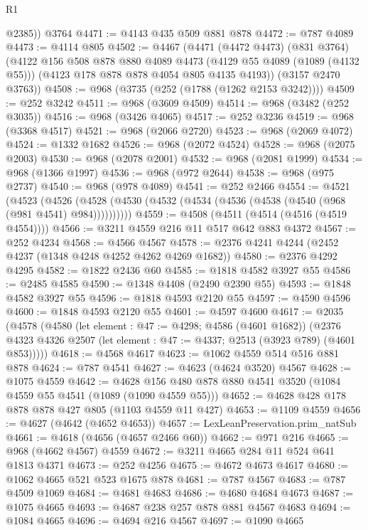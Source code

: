 \begin{lexlean}{R1}
\begin{coremodule}
        @2385))
    @3764
@4471 := @4143 @435 @509 @881 @878
@4472 := @787 @4089
@4473 := @4114 @805
@4502 := @4467
    (@4471
      (@4472 @4473)
      (@831 @3764)
      (@4122
        @156
        @508
        @878
        @880
        @4089
        @4473
        (@4129 @55 @4089 (@1089 (@4132 @55)))
        (@4123 @178 @878 @878 @4054 @805 @4135 @4193))
      (@3157 @2470 @3763))
@4508 := @968 (@3735 (@252 (@1788 (@1262 @2153 @3242))))
@4509 := @252 @3242
@4511 := @968 (@3609 @4509)
@4514 := @968 (@3482 (@252 @3035))
@4516 := @968 (@3426 @4065)
@4517 := @252 @3236
@4519 := @968 (@3368 @4517)
@4521 := @968 (@2066 @2720)
@4523 := @968 (@2069 @4072)
@4524 := @1332 @1682
@4526 := @968 (@2072 @4524)
@4528 := @968 (@2075 @2003)
@4530 := @968 (@2078 @2001)
@4532 := @968 (@2081 @1999)
@4534 := @968 (@1366 @1997)
@4536 := @968 (@972 @2644)
@4538 := @968 (@975 @2737)
@4540 := @968 (@978 @4089)
@4541 := @252 @2466
@4554 := @4521
    (@4523 (@4526 (@4528 (@4530 (@4532 (@4534 (@4536 (@4538 (@4540 (@968 (@981 @4541) @984))))))))))
@4559 := @4508 (@4511 (@4514 (@4516 (@4519 @4554))))
@4566 := @3211 @4559 @216 @11 @517 @642 @883 @4372
@4567 := @252 @4234
@4568 := @4566 @4567
@4578 := @2376 @4241 @4244 (@2452 @4237 (@1348 @4248 @4252 @4262 @4269 @1682))
@4580 := @2376 @4292 @4295
@4582 := @1822 @2436 @60
@4585 := @1818 @4582 @3927 @55
@4586 := @2485 @4585
@4590 := @1348 @4408 (@2490 @2390 @55)
@4593 := @1848 @4582 @3927 @55
@4596 := @1818 @4593 @2120 @55
@4597 := @4590 @4596
@4600 := @1848 @4593 @2120 @55
@4601 := @4597 @4600
@4617 := @2035
    (@4578
      (@4580
        (let element : @47 := @4298; @4586 (@4601 @1682))
        (@2376 @4323 @4326 @2507 (let element : @47 := @4337; @2513 (@3923 @789) (@4601 @853)))))
@4618 := @4568 @4617
@4623 := @1062 @4559 @514 @516 @881 @878
@4624 := @787 @4541
@4627 := @4623 (@4624 @3520) @4567
@4628 := @1075 @4559
@4642 := @4628 @156 @480 @878 @880 @4541 @3520 (@1084 @4559 @55 @4541 (@1089 (@1090 @4559 @55)))
@4652 := @4628 @428 @178 @878 @878 @427 @805 (@1103 @4559 @11 @427)
@4653 := @1109 @4559
@4656 := @4627 (@4642 (@4652 @4653))
@4657 := LexLeanPreservation.prim_natSub
@4661 := @4618 (@4656 (@4657 @2466 @60))
@4662 := @971 @216
@4665 := @968 (@4662 @4567) @4559
@4672 := @3211 @4665 @284 @11 @524 @641 @1813 @4371
@4673 := @252 @4256
@4675 := @4672 @4673 @4617
@4680 := @1062 @4665 @521 @523 @1675 @878
@4681 := @787 @4567
@4683 := @787 @4509 @1069
@4684 := @4681 @4683
@4686 := @4680 @4684 @4673
@4687 := @1075 @4665
@4693 := @4687 @238 @257 @878 @881 @4567 @4683
@4694 := @1084 @4665
@4696 := @4694 @216 @4567
@4697 := @1090 @4665

\end{coremodule}
\end{lexlean}
